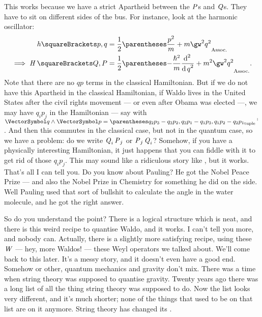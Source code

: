 \documentclass[10pt, a4paper, twoside]{lecturenotes}
\begin{document}
\begin{lecture}[date=2013-04-16]
This works because we have a strict Apartheid between the $\operatorname{\mathit{P}}$s and $\operatorname{\mathit{Q}}$s. They have to sit on different sides of the bus.
For instance, look at the harmonic oscillator:
\begin{align*}
h\of{p,q}&= \frac{1}{2}\pa{\frac{p^2}{m}+m\gw^2 q^2}\\
\Implies
\opH\of{Q, P} &= \frac{1}{2}\pa{-\frac{\ReducedPlanck^2}{m}\derivop[2] q + m^2 \gw^2 q^2}\text.
\end{align*}
Note that there are no $qp$ terms in the classical Hamiltonian.
But if we do not have this Apartheid in the classical Hamiltonian, if Waldo lives in the United States after the civil rights movement --- or even after Obama was elected ---, we may have $q_i p_j$ in the Hamiltonian --- say with $\vq \Exterior \vp = \smash{\Transpose{\tuple{q_2 p_3 - q_3 p_2, q_3 p_1 - q_1 p_3, q_1 p_2 - q_2 p_1}}}$. And then this commutes in the classical case, but not in the quantum case, so we have a problem: do we write $\operatorname{\mathit{Q}}_i \operatorname{\mathit{P}}_j$ or $\operatorname{\mathit{P}}_j \operatorname{\mathit{Q}}_i$? Somehow, if you have a physically interesting Hamiltonian, it just happens that you can fiddle with it to get rid of those $q_i p_j$. This may sound like a ridiculous story like , but it works. That's all I can tell you. Do you know about Pauling? He got the Nobel Peace Prize --- and also the Nobel Prize in Chemistry for something he did on the side. Well Pauling used that sort of bullshit to calculate the angle in the water molecule, and he got the right answer.

So do you understand the point? There is a logical structure which is neat, and there is this weird recipe to quantise Waldo, and it works. I can't tell you more, and nobody can. Actually, there is a slightly more satisfying recipe, using these $\operatorname{\mathit{W}}$ --- hey, more Waldos! --- these Weyl operators we talked about. We'll come back to this later. It's a messy story, and it doesn't even have a good end. Somehow or other, quantum mechanics and gravity don't mix. There was a time when string theory was supposed to quantise gravity. Twenty years ago there was a long list of all the thing string theory was supposed to do. Now the list looks very different, and it's much shorter; none of the things that used to be on that list are on it anymore. String theory has changed its .
\end{lecture}
\endgroup%
\end{document}

